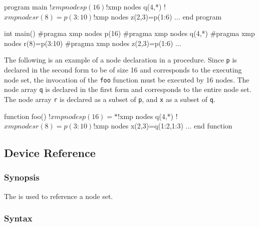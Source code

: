 \vspace{0.5cm}

\begin{minipage}{0.45\hsize}
\begin{center}
\begin{XFexample}
      program main
!$xmp nodes p(16)
!$xmp nodes q(4,*)
!$xmp nodes r(8)=p(3:10)
!$xmp nodes z(2,3)=p(1:6)
      ...       
      end program 
\end{XFexample}
\end{center}
\end{minipage}
%
\begin{minipage}{0.45\hsize}
\begin{center}
\begin{XCexampleR}
int main() {
#pragma xmp nodes p(16)
#pragma xmp nodes q(4,*)
#pragma xmp nodes r(8)=p(3:10)
#pragma xmp nodes z(2,3)=p(1:6)
    ...
}
\end{XCexampleR}
\end{center}
\end{minipage}

\vspace{0.5cm}

The following is an example of a node declaration in a procedure.
Since {\tt p} is declared in the second form to be of size 16 and
corresponds to the executing node set, the invocation of the {\tt foo}
function must be executed by 16 nodes.
%
The node array {\tt q} is declared in the first form and corresponds to
the entire node set. The node array {\tt r} is declared as a subset of
{\tt p}, and {\tt x} as a subset of {\tt q}.

\begin{XFexample}
      function foo()
!$xmp nodes p(16)=*
!$xmp nodes q(4,*)
!$xmp nodes r(8)=p(3:10)
!$xmp nodes x(2,3)=q(1:2,1:3)
      ...
      end function
\end{XFexample}


\subsection{Device Reference}

\subsubsection*{Synopsis}

The  is used to reference a node set.

\subsubsection*{Syntax}


